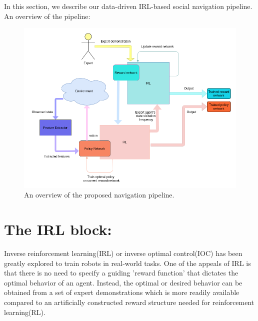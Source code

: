 In this section, we describe our data-driven IRL-based social navigation pipeline.\\
An overview of the pipeline:

\begin{figure}
	\centering
	\includegraphics[width=\linewidth]{figures/irl_pipeline.png}
	\caption{An overview of the proposed navigation pipeline.}
	\label{fig:irl_pipeline}
\end{figure}

\section{The IRL block:}
Inverse reinforcement learning(IRL) or inverse optimal control(IOC) has been greatly explored to train robots in real-world tasks. One of the appeals of IRL is that there is no need to specify a guiding 'reward function' that dictates the optimal behavior of an agent. Instead, the optimal or desired behavior can be obtained from a set of expert demonstrations which is more readily available compared to an artificially constructed reward structure needed for reinforcement learning(RL).

